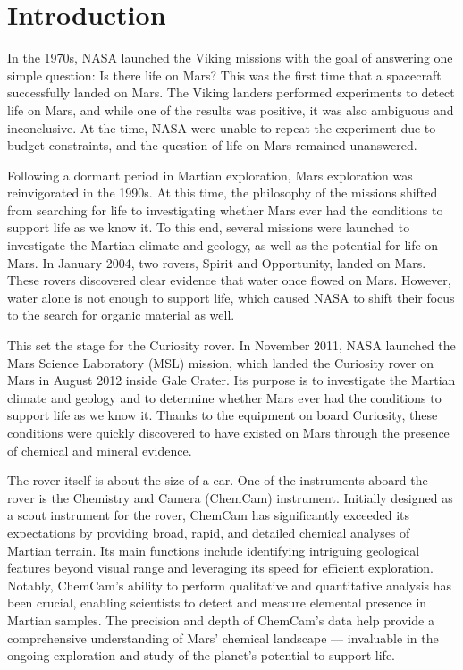 \section{Introduction}\label{sec:introduction}
In the 1970s, NASA launched the Viking missions with the goal of answering one simple question: Is there life on Mars?
This was the first time that a spacecraft successfully landed on Mars.
The Viking landers performed experiments to detect life on Mars, and while one of the results was positive, it was also ambiguous and inconclusive.
At the time, NASA were unable to repeat the experiment due to budget constraints, and the question of life on Mars remained unanswered.\cite{marsnasagov_vikings}

Following a dormant period in Martian exploration, Mars exploration was reinvigorated in the 1990s.
At this time, the philosophy of the missions shifted from searching for life to investigating whether Mars ever had the conditions to support life as we know it.
To this end, several missions were launched to investigate the Martian climate and geology, as well as the potential for life on Mars.
In January 2004, two rovers, Spirit and Opportunity, landed on Mars.
These rovers discovered clear evidence that water once flowed on Mars.
However, water alone is not enough to support life, which caused NASA to shift their focus to the search for organic material as well.\cite{marsnasagov_observer, marsnasagov_spirit_opportunity}

This set the stage for the Curiosity rover.
In November 2011, NASA launched the Mars Science Laboratory (MSL) mission, which landed the Curiosity rover on Mars in August 2012 inside Gale Crater.
Its purpose is to investigate the Martian climate and geology and to determine whether Mars ever had the conditions to support life as we know it.
Thanks to the equipment on board Curiosity, these conditions were quickly discovered to have existed on Mars through the presence of chemical and mineral evidence.\cite{chemcamNasaWebsite}


The rover itself is about the size of a car.
One of the instruments aboard the rover is the Chemistry and Camera (ChemCam) instrument.
Initially designed as a scout instrument for the rover, ChemCam has significantly exceeded its expectations by providing broad, rapid, and detailed chemical analyses of Martian terrain.
Its main functions include identifying intriguing geological features beyond visual range and leveraging its speed for efficient exploration.
Notably, ChemCam's ability to perform qualitative and quantitative analysis has been crucial, enabling scientists to detect and measure elemental presence in Martian samples.
The precision and depth of ChemCam's data help provide a comprehensive understanding of Mars' chemical landscape --- invaluable in the ongoing exploration and study of the planet's potential to support life.\cite{chemcamNasaWebsite}

